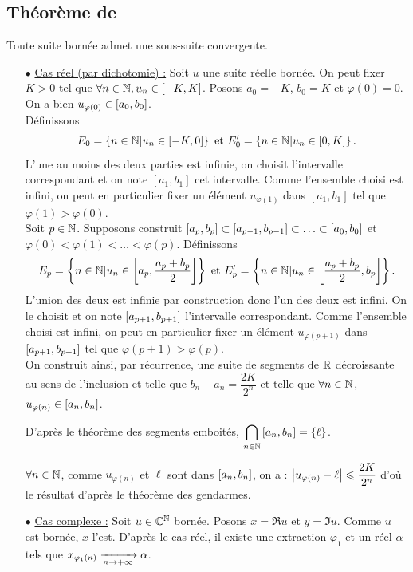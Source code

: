 \documentclass{magnoliaold}
\begin{document}
\subsection{Théorème de }

\begin{theoreme}[nom={Théorème de \nom{Bolzano-Weierstrass}}]
Toute suite bornée admet une sous-suite convergente.
\end{theoreme}

\begin{preuve}
\begin{itemize}
\item[$\bullet$] \underline{Cas réel (par dichotomie) :} Soit $u$ une suite réelle bornée. On peut fixer $K>0$ tel que $\forall n\in \mathbb{N}, u_n\in \left[-K,K\right]$. Posons $a_0=-K$, $b_0=K$ et $\varphi(0)=0$. On a bien $u_{\varphi(0)}\in \left[a_0,b_0\right]$.\\
Définissons \[E_0=\left\{n\in\mathbb{N} | u_n \in \left[-K,0\right]\right\} \text{ et } E'_0=\left\{n\in\mathbb{N} | u_n \in \left[0,K\right]\right\}.\] L'une au moins des deux parties est infinie, on choisit l'intervalle correspondant et on note $[a_1,b_1]$ cet intervalle. Comme l'ensemble choisi est infini, on peut en particulier fixer un élément $u_{\varphi(1)}$ dans $[a_1,b_1]$ tel que $\varphi(1)>\varphi(0)$.\\
Soit $p\in \mathbb{N}$. Supposons construit $\left[a_p,b_p\right] \subset\left[a_{p-1},b_{p-1}\right]\subset\ldots\subset\left[a_0,b_0\right]$ et $\varphi(0)<\varphi(1)<\ldots<\varphi(p)$. Définissons \[E_p=\left\{n\in\mathbb{N} | u_n \in \left[a_p,\frac{a_p+b_p}{2}\right]\right\} \text{ et } E'_p=\left\{n\in\mathbb{N} | u_n \in \left[\frac{a_p+b_p}{2},b_p\right]\right\}.\]
L'union des deux est infinie par construction donc l'un des deux est infini. On le choisit et on note $\left[a_{p+1},b_{p+1}\right]$ l'intervalle correspondant. Comme l'ensemble choisi est infini, on peut en particulier fixer un élément $u_{\varphi(p+1)}$ dans $\left[a_{p+1},b_{p+1}\right]$ tel que $\varphi(p+1)>\varphi(p)$.\\

On construit ainsi, par récurrence, une suite de segments de $\mathbb{R}$ décroissante au sens de l'inclusion et telle que $b_n-a_n=\dfrac{2K}{2^n}$ et telle que $\forall n\in \mathbb{N}$, $u_{\varphi(n)}\in \left[a_n,b_n\right]$.

D'après le théorème des segments emboités, $\displaystyle \bigcap_{n\in \mathbb{N}}\left[a_n,b_n\right]=\left\{\ell\right\}$.

$\forall n\in \mathbb{N}$, comme $u_{\varphi(n)}$ et $\ell$ sont dans $\left[a_n,b_n\right]$, on a : $\left|u_{\varphi(n)}-\ell\right|\leqslant \dfrac{2K}{2^n}$ d'où le résultat d'après le théorème des gendarmes.
\item[$\bullet$] \underline{Cas complexe :} Soit $u\in\mathbb{C}^{\mathbb{N}}$ bornée. Posons $x=\Re u$ et $y=\Im u$. Comme $u$ est bornée, $x$ l'est. D'après le cas réel, il existe une extraction $\varphi_1$ et un réel $\alpha$ tels que $x_{\varphi_1(n)}\xrightarrow[n\rightarrow +\infty]{}\alpha$.


\end{itemize}
\end{preuve}
\end{document}
